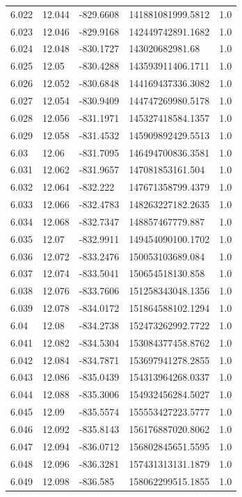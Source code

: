 \begin{tabular}{lllll}
6.022 & 12.044 & -829.6608 & 141881081999.5812 & 1.0 \\
6.023 & 12.046 & -829.9168 & 142449742891.1682 & 1.0 \\
6.024 & 12.048 & -830.1727 & 143020682981.68 & 1.0 \\
6.025 & 12.05 & -830.4288 & 143593911406.1711 & 1.0 \\
6.026 & 12.052 & -830.6848 & 144169437336.3082 & 1.0 \\
6.027 & 12.054 & -830.9409 & 144747269980.5178 & 1.0 \\
6.028 & 12.056 & -831.1971 & 145327418584.1357 & 1.0 \\
6.029 & 12.058 & -831.4532 & 145909892429.5513 & 1.0 \\
6.03 & 12.06 & -831.7095 & 146494700836.3581 & 1.0 \\
6.031 & 12.062 & -831.9657 & 147081853161.504 & 1.0 \\
6.032 & 12.064 & -832.222 & 147671358799.4379 & 1.0 \\
6.033 & 12.066 & -832.4783 & 148263227182.2635 & 1.0 \\
6.034 & 12.068 & -832.7347 & 148857467779.887 & 1.0 \\
6.035 & 12.07 & -832.9911 & 149454090100.1702 & 1.0 \\
6.036 & 12.072 & -833.2476 & 150053103689.084 & 1.0 \\
6.037 & 12.074 & -833.5041 & 150654518130.858 & 1.0 \\
6.038 & 12.076 & -833.7606 & 151258343048.1356 & 1.0 \\
6.039 & 12.078 & -834.0172 & 151864588102.1294 & 1.0 \\
6.04 & 12.08 & -834.2738 & 152473262992.7722 & 1.0 \\
6.041 & 12.082 & -834.5304 & 153084377458.8762 & 1.0 \\
6.042 & 12.084 & -834.7871 & 153697941278.2855 & 1.0 \\
6.043 & 12.086 & -835.0439 & 154313964268.0337 & 1.0 \\
6.044 & 12.088 & -835.3006 & 154932456284.5027 & 1.0 \\
6.045 & 12.09 & -835.5574 & 155553427223.5777 & 1.0 \\
6.046 & 12.092 & -835.8143 & 156176887020.8062 & 1.0 \\
6.047 & 12.094 & -836.0712 & 156802845651.5595 & 1.0 \\
6.048 & 12.096 & -836.3281 & 157431313131.1879 & 1.0 \\
6.049 & 12.098 & -836.585 & 158062299515.1855 & 1.0 \\

\end{tabular}
